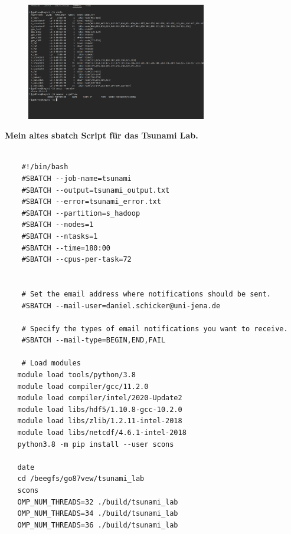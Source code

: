 \documentclass{article}
\begin{document}
\begin{figure}[H]
    \includegraphics[width=0.7\textwidth]{ARA.png}
\end{figure}

\textbf{Mein altes sbatch Script für das Tsunami Lab.}

\begin{mdframed}[innertopmargin=0.2cm,
                 innerbottommargin= -0.5cm,
                 innerleftmargin=0.5cm, 
                 innerrightmargin=-5cm,
                 rightmargin=6cm]
    \begin{verbatim}
    
    #!/bin/bash
    #SBATCH --job-name=tsunami
    #SBATCH --output=tsunami_output.txt
    #SBATCH --error=tsunami_error.txt
    #SBATCH --partition=s_hadoop
    #SBATCH --nodes=1
    #SBATCH --ntasks=1
    #SBATCH --time=180:00
    #SBATCH --cpus-per-task=72


    # Set the email address where notifications should be sent.
    #SBATCH --mail-user=daniel.schicker@uni-jena.de

    # Specify the types of email notifications you want to receive.
    #SBATCH --mail-type=BEGIN,END,FAIL

    # Load modules 
   module load tools/python/3.8
   module load compiler/gcc/11.2.0
   module load compiler/intel/2020-Update2
   module load libs/hdf5/1.10.8-gcc-10.2.0
   module load libs/zlib/1.2.11-intel-2018
   module load libs/netcdf/4.6.1-intel-2018
   python3.8 -m pip install --user scons

   date
   cd /beegfs/go87vew/tsunami_lab
   scons
   OMP_NUM_THREADS=32 ./build/tsunami_lab
   OMP_NUM_THREADS=34 ./build/tsunami_lab
   OMP_NUM_THREADS=36 ./build/tsunami_lab
  
    
    \end{verbatim}
\end{mdframed}
\end{document}
